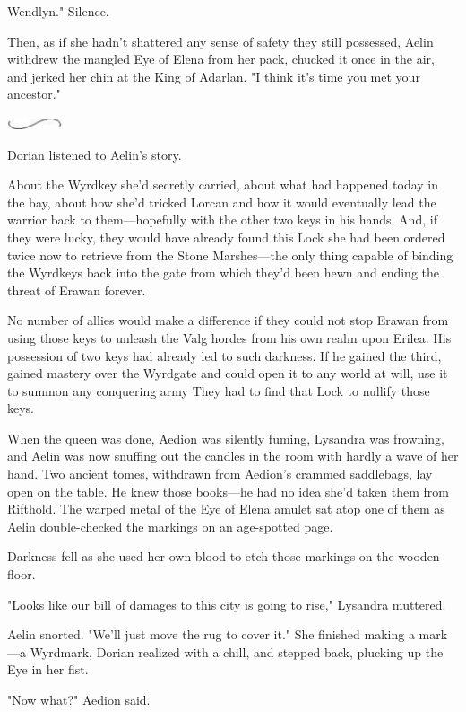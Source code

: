 Wendlyn." Silence.

Then, as if she hadn't shattered any sense of safety they still possessed, Aelin withdrew the mangled Eye of Elena from her pack, chucked it once in the air, and jerked her chin at the King of Adarlan. "I think it's time you met your ancestor."

\includegraphics[width=0.65in,height=0.13in]{images/seperator}

Dorian listened to Aelin's story.

About the Wyrdkey she'd secretly carried, about what had happened today in the bay, about how she'd tricked Lorcan and how it would eventually lead the warrior back to them---hopefully with the other two keys in his hands. And, if they were lucky, they would have already found this Lock she had been ordered twice now to retrieve from the Stone Marshes---the only thing capable of binding the Wyrdkeys back into the gate from which they'd been hewn and ending the threat of Erawan forever.

No number of allies would make a difference if they could not stop Erawan from using those keys to unleash the Valg hordes from his own realm upon Erilea. His possession of two keys had already led to such darkness. If he gained the third, gained mastery over the Wyrdgate and could open it to any world at will, use it to summon any conquering army
 They had to find that Lock to nullify those keys.

When the queen was done, Aedion was silently fuming, Lysandra was frowning, and Aelin was now snuffing out the candles in the room with hardly a wave of her hand. Two ancient tomes, withdrawn from Aedion's crammed saddlebags, lay open on the table. He knew those books---he had no idea she'd taken them from Rifthold. The warped metal of the Eye of Elena amulet sat atop one of them as Aelin double-checked the markings on an age-spotted page.

Darkness fell as she used her own blood to etch those markings on the wooden floor.

"Looks like our bill of damages to this city is going to rise," Lysandra muttered.

Aelin snorted. "We'll just move the rug to cover it." She finished making a mark---a Wyrdmark, Dorian realized with a chill, and stepped back, plucking up the Eye in her fist.

"Now what?" Aedion said.

